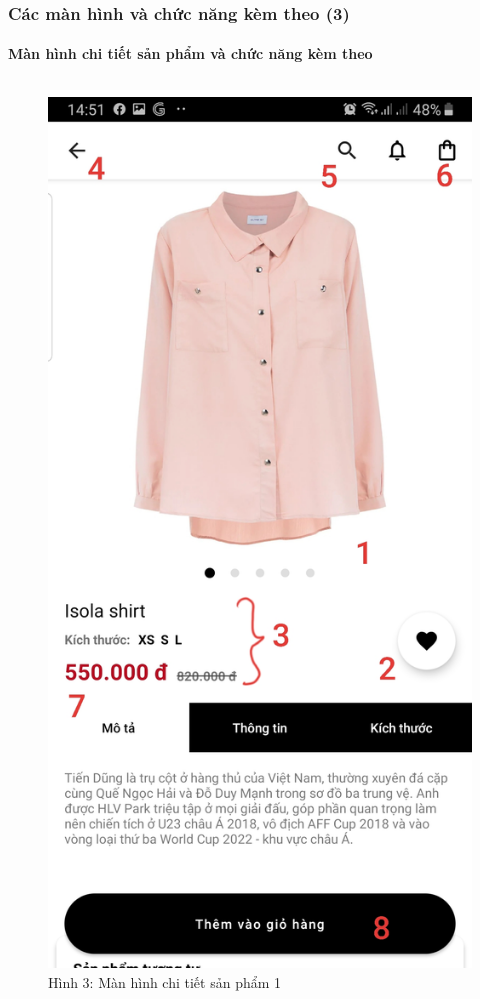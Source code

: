 \documentclass{beamer}
\begin{document}
\begin{frame}
    \frametitle{Các màn hình và chức năng kèm theo (3)}
    \framesubtitle{Màn hình chi tiết sản phẩm và chức năng kèm theo}

    \begin{columns}
        \begin{figure}
            \centering
            \includegraphics[height=0.7\textheight]{images/03.png}
            \caption{\centering\tiny{Hình 3: Màn hình chi tiết sản phẩm 1}}


\end{figure}
\end{columns}
\end{frame}
\end{document}
